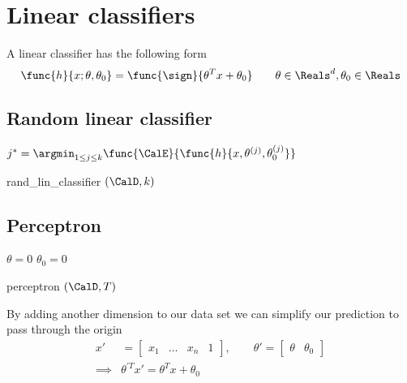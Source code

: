 \section{Linear classifiers}
A linear classifier has the following form
\begin{equation*}
    \func{h}{x; \theta , \theta_0} = \func{\sign}{\theta^T x + \theta_0} \qquad \theta \in \Reals^d , \theta_0 \in \Reals
\end{equation*}

\subsection{Random linear classifier}
\begin{algorithm}[H]
    \DontPrintSemicolon
    $j^\ast = \argmin_{\substack{1 \leq j \leq k}} \func{\CalE}{\func{h}{x, \theta^{(j)} , \theta^{(j)}_0}}$

    \caption{ rand\_lin\_classifier $(\CalD , k )$}
\end{algorithm}

\subsection{Perceptron}
\begin{algorithm}[H] \label{algo:perceptron}
    \DontPrintSemicolon
    $\theta = 0 $\;
    $\theta_0 = 0 $\;

    \caption{ perceptron $(\CalD , T )$}
\end{algorithm}


By adding another dimension to our data set we can simplify our prediction to pass through the origin
\begin{align*}
    x'       & = \begin{bmatrix}
        x_1 & \dots & x_n & 1
    \end{bmatrix}, \qquad \theta' = \begin{bmatrix}
        \theta & \theta_0
    \end{bmatrix} \\
    \implies & \theta^{'T} x' = \theta^T x + \theta_0
\end{align*}

